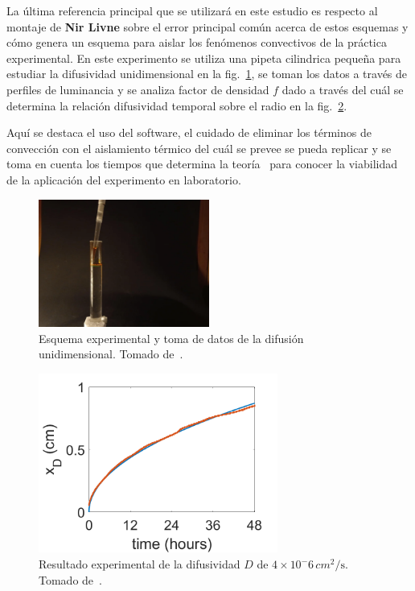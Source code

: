\documentclass[11pt]{article}
\begin{document}
La última referencia principal que se utilizará en este estudio es respecto al montaje de \textbf{Nir Livne} sobre el error principal común acerca de estos esquemas y cómo genera un esquema para aislar los fenómenos convectivos de la práctica experimental. En este experimento se utiliza una pipeta cilindrica pequeña para estudiar la difusividad unidimensional en la fig.~\ref{fig:arrNir_fotos}, se toman los datos a través de perfiles de luminancia y se analiza factor de densidad $f$ dado a través del cuál se determina la relación difusividad temporal sobre el radio en la fig.~\ref{fig:arrNir_plot}.

Aquí se destaca el uso del software, el cuidado de eliminar los términos de convección con el aislamiento térmico del cuál se prevee se pueda replicar y se toma en cuenta los tiempos que determina la teoría~\cite{leeInkDifussionWater2004,nirlRealDiffusionExperiment} para conocer la viabilidad de la aplicación del experimento en laboratorio.

\begin{figure}[htp]
    \centering
    \includegraphics[width=0.5\textwidth]{figs/arrNir_esquema.png}
    \caption{Esquema experimental y toma de datos de la difusión unidimensional. Tomado de~\cite{nirlRealDiffusionExperiment}.}
    \label{fig:arrNir_fotos}
\end{figure}
\begin{figure}[htp]
    \centering
    \includegraphics[width=0.7\textwidth]{figs/arrNir_plot.png}
    \caption{Resultado experimental de la difusividad $D$ de $4 \times 10^-6 \, \unit{cm^2/\second}$. Tomado de~\cite{nirlRealDiffusionExperiment}.}
    \label{fig:arrNir_plot}
\end{figure}
\end{document}
